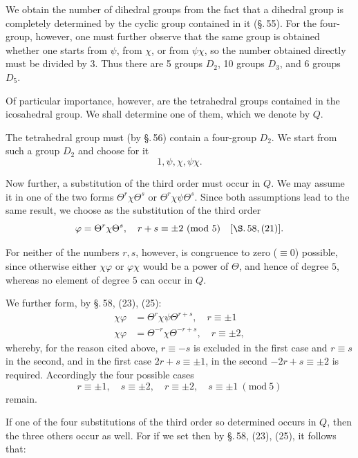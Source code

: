 We obtain the number of dihedral groups from the fact that a dihedral group is completely determined by the cyclic group contained in it (\S.\,55). For the four-group, however, one must further observe that the same group is obtained whether one starts from $\psi$, from $\chi$, or from $\psi\chi$, so the number obtained directly must be divided by 3. Thus there are 5 groups $D_2$, 10 groups $D_3$, and 6 groups $D_5$.

Of particular importance, however, are the tetrahedral groups contained in the icosahedral group. We shall determine one of them, which we denote by $Q$.

The tetrahedral group must (by \S.\,56) contain a four-group $D_2$. We start from such a group $D_2$ and choose for it
\[
1, \psi, \chi, \psi\chi.
\]

Now further, a substitution of the third order must occur in $Q$. We may assume it in one of the two forms $\Theta^r\chi\Theta^s$ or $\Theta^r\chi\psi\Theta^s$. Since both assumptions lead to the same result, we choose as the substitution of the third order
\[
\varphi = \Theta^r\chi\Theta^s, \quad r+s\equiv\pm2 \ (\mathrm{mod}\ 5) \quad [\S.\,58, (21)].
\]

For neither of the numbers $r, s$, however, is congruence to zero ($\equiv0$) possible, since otherwise either $\chi\varphi$ or $\varphi\chi$ would be a power of $\Theta$, and hence of degree $5$, whereas no element of degree $5$ can occur in $Q$.

We further form, by \S.\,58, (23), (25):
\[
\begin{aligned}
\chi\varphi &= \Theta^r\chi\psi\Theta^{r+s}, \quad r\equiv\pm1 \\
\chi\varphi &= \Theta^{-r}\chi\Theta^{-r+s}, \quad r\equiv\pm2,
\end{aligned}
\]
whereby, for the reason cited above, $r\equiv-s$ is excluded in the first case and $r\equiv s$ in the second, and in the first case $2r+s\equiv\pm1$, in the second $-2r+s\equiv\pm2$ is required. Accordingly the four possible cases
\[
r\equiv\pm1, \quad s\equiv\pm2, \quad r\equiv\pm2, \quad s\equiv\pm1 \ (\mathrm{mod}\ 5)
\]
remain.

If one of the four substitutions of the third order so determined occurs in $Q$, then the three others occur as well. For if we set
then by \S.\,58, (23), (25), it follows that:
